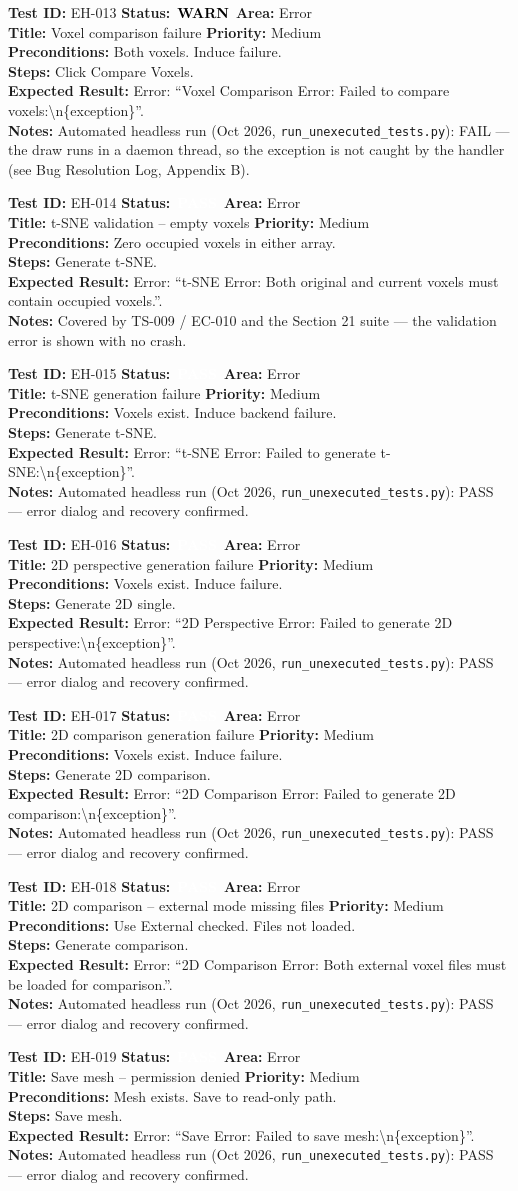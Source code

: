 \documentclass[12pt,a4paper]{article}
\newcommand{\statuspass}{\colorbox{statusgreen}{\textcolor{white}{\textbf{\,PASS\,}}}}
\newcommand{\statuswarn}{\colorbox{statusyellow}{\textcolor{black}{\textbf{\,WARN\,}}}}
\newcommand{\testcase}[9]{%
  \smallskip
  \noindent\textbf{Test ID:} #1 \hfill \textbf{Status:} #2 \hfill \textbf{Area:} #3 \\
  \textbf{Title:} #4 \hfill \textbf{Priority:} #5 \\[0.3em]
  \textbf{Preconditions:} #6 \\[0.3em]
  \textbf{Steps:} #7 \\[0.3em]
  \textbf{Expected Result:} #8 \\
  \textbf{Notes:} #9
  \smallskip
}
\begin{document}
\testcase{EH-013}{\statuswarn}{Error}{Voxel comparison failure}{Medium}{Both voxels. Induce failure.}{Click Compare Voxels.}{Error: ``Voxel Comparison Error: Failed to compare voxels:\textbackslash n\{exception\}''.}{Automated headless run (Oct 2026, \texttt{run\_unexecuted\_tests.py}): FAIL --- the draw runs in a daemon thread, so the exception is not caught by the handler (see Bug Resolution Log, Appendix B).}


\testcase{EH-014}{\statuspass}{Error}{t-SNE validation -- empty voxels}{Medium}{Zero occupied voxels in either array.}{Generate t-SNE.}{Error: ``t-SNE Error: Both original and current voxels must contain occupied voxels.''.}{Covered by TS-009 / EC-010 and the Section 21 suite --- the validation error is shown with no crash.}


\testcase{EH-015}{\statuspass}{Error}{t-SNE generation failure}{Medium}{Voxels exist. Induce backend failure.}{Generate t-SNE.}{Error: ``t-SNE Error: Failed to generate t-SNE:\textbackslash n\{exception\}''.}{Automated headless run (Oct 2026, \texttt{run\_unexecuted\_tests.py}): PASS --- error dialog and recovery confirmed.}


\testcase{EH-016}{\statuspass}{Error}{2D perspective generation failure}{Medium}{Voxels exist. Induce failure.}{Generate 2D single.}{Error: ``2D Perspective Error: Failed to generate 2D perspective:\textbackslash n\{exception\}''.}{Automated headless run (Oct 2026, \texttt{run\_unexecuted\_tests.py}): PASS --- error dialog and recovery confirmed.}


\testcase{EH-017}{\statuspass}{Error}{2D comparison generation failure}{Medium}{Voxels exist. Induce failure.}{Generate 2D comparison.}{Error: ``2D Comparison Error: Failed to generate 2D comparison:\textbackslash n\{exception\}''.}{Automated headless run (Oct 2026, \texttt{run\_unexecuted\_tests.py}): PASS --- error dialog and recovery confirmed.}


\testcase{EH-018}{\statuspass}{Error}{2D comparison -- external mode missing files}{Medium}{Use External checked. Files not loaded.}{Generate comparison.}{Error: ``2D Comparison Error: Both external voxel files must be loaded for comparison.''.}{Automated headless run (Oct 2026, \texttt{run\_unexecuted\_tests.py}): PASS --- error dialog and recovery confirmed.}


\testcase{EH-019}{\statuspass}{Error}{Save mesh -- permission denied}{Medium}{Mesh exists. Save to read-only path.}{Save mesh.}{Error: ``Save Error: Failed to save mesh:\textbackslash n\{exception\}''.}{Automated headless run (Oct 2026, \texttt{run\_unexecuted\_tests.py}): PASS --- error dialog and recovery confirmed.}
\end{document}
